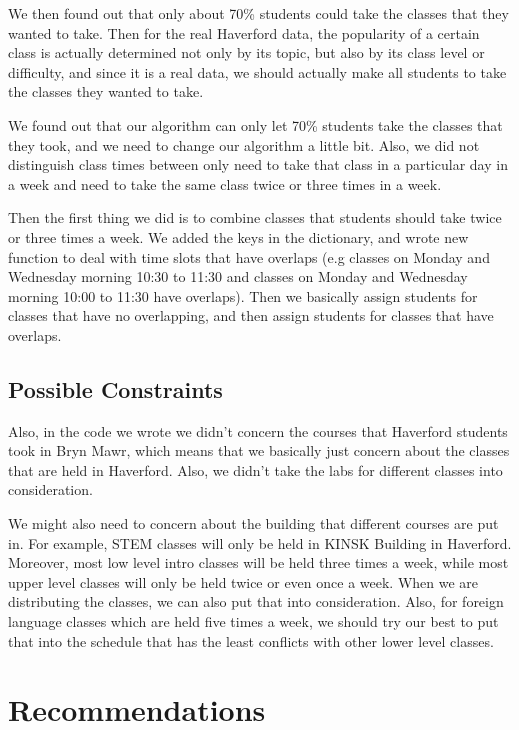 \documentclass[11pt, oneside]{article}   	%
\begin{document}
We then found out that only about 70\% students could take the classes that they wanted to take. Then for the real Haverford data, the popularity of a certain class is actually determined not only by its topic, but also by its class level or difficulty, and since it is a real data, we should actually make all students to take the classes they wanted to take. 

We found out that our algorithm can only let 70\% students take the classes that they took, and we need to change our algorithm a little bit. Also, we did not distinguish class times between only need to take that class in a particular day in a week and need to take the same class twice or three times in a week. 

Then the first thing we did is to combine classes that students should take twice or three times a week. We added the keys in the dictionary, and wrote new function to deal with time slots that have overlaps (e.g classes on Monday and Wednesday morning 10:30 to 11:30 and classes on Monday and Wednesday morning 10:00 to 11:30 have overlaps). Then we basically assign students for classes that have no overlapping, and then assign students for classes that have overlaps. 

\subsection{Possible Constraints}
Also, in the code we wrote we didn't concern the courses that Haverford students took in Bryn Mawr, which means that we basically just concern about the classes that are held in Haverford. Also, we didn't take the labs for different classes into consideration.

We might also need to concern about the building that different courses are put in. For example, STEM classes will only be held in KINSK Building in Haverford. Moreover, most low level intro classes will be held three times a week, while most upper level classes will only be held twice or even once a week. When we are distributing the classes, we can also put that into consideration. Also, for foreign language classes which are held five times a week, we should try our best to put that into the schedule that has the least conflicts with other lower level classes. 

\newpage
\section{Recommendations}
\end{document}
